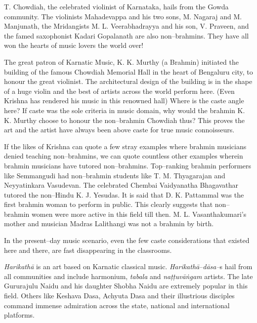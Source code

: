 T. Chowdiah, the celebrated violinist of Karnataka, hails from the Gowda community. The violinists Mahadevappa and his two sons, M. Nagaraj and M. Manjunath, the Mridangists M. L. Veerabhadrayya and his son, V. Praveen, and the famed saxophonist Kadari Gopalanath are also non–brahmins. They have all won the hearts of music lovers the world over!

The great patron of Karnatic Music, K. K. Murthy (a Brahmin) initiated the building of the famous Chowdiah Memorial Hall in the heart of Bengaluru city, to honour the great violinist. The architectural design of the building is in the shape of a huge violin and the best of artists across the world perform here. (Even Krishna has rendered his music in this renowned hall) Where is the caste angle here? If caste was the sole criteria in music domain, why would the brahmin K. K. Murthy choose to honour the non–brahmin Chowdiah thus? This proves the art and the artist have always been above caste for true music connoisseurs.

If the likes of Krishna can quote a few stray examples where brahmin musicians denied teaching non–brahmins, we can quote countless other examples wherein brahmin musicians have tutored non–brahmins. Top–ranking brahmin performers like Semmangudi had non–brahmin students like T. M. Thyagarajan and Neyyatinkara Vasudevan. The celebrated Chembai Vaidyanatha Bhagavathar tutored the non–Hindu K. J. Yesudas. It is said that D. K. Pattammal was the first brahmin woman to perform in public. This clearly suggests that non–brahmin women were more active in this field till then. M. L. Vasanthakumari’s mother and musician Madras Lalithangi was not a brahmin by birth.

In the present–day music scenario, even the few caste considerations that existed here and there, are fast disappearing in the classrooms. 

\textit{Harikathā} is an art based on Karnatic classical music. \textit{Harikathā}–\textit{dāsa–}s hail from all communities and include harmonium, \textit{tabala} and \textit{naṭṭuvāṅgam} artists. The late Gururajulu Naidu and his daughter Shobha Naidu are extremely popular in this field. Others like Keshava Dasa, Achyuta Dasa and their illustrious disciples command immense admiration across the state, national and international platforms.

